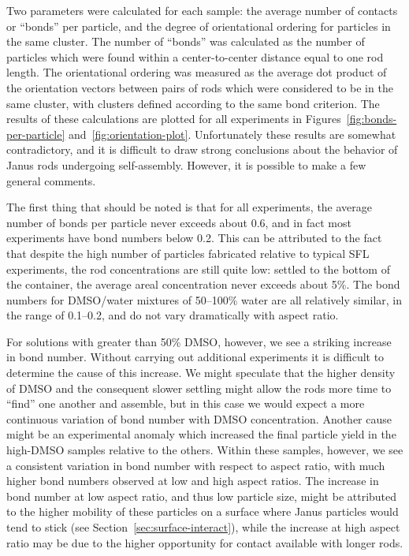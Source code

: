 Two parameters were calculated for each sample: the average number of contacts or ``bonds''
per particle, and the degree of orientational ordering for particles in the same cluster.
The number of ``bonds'' was calculated as the number of particles which were found within a 
center-to-center distance equal to one rod length.  The orientational ordering was measured
as the average dot product of the orientation vectors between pairs of rods which were 
considered to be in the same cluster, with clusters defined according to the same bond criterion.
The results of these calculations are plotted for all experiments in Figures~\ref{fig:bonds-per-particle}
and~\ref{fig:orientation-plot}.  Unfortunately these results are somewhat contradictory, and it 
is difficult to draw strong conclusions about the behavior of Janus rods undergoing self-assembly.
However, it is possible to make a few general comments.

The first thing that should be noted is that for all experiments, the average number of bonds per
particle never exceeds about 0.6, and in fact most experiments have bond numbers below 0.2.  This
can be attributed to the fact that despite the high number of particles fabricated relative to
typical SFL experiments, the rod concentrations are still quite low: settled to the bottom of the
container, the average areal concentration never exceeds about 5\%.  The bond numbers for 
DMSO/water mixtures of 50--100\% water are all relatively similar, in the range of 0.1--0.2, and do
not vary dramatically with aspect ratio.  

For solutions with greater than 
50\% DMSO, however, we see a striking increase in bond number.  Without carrying out additional experiments it 
is difficult to determine the cause of this increase. We might speculate that the higher density of DMSO
and the consequent slower settling might allow the rods more time to ``find'' one another and assemble, but in
this case we would expect a more continuous variation of bond number with DMSO concentration. Another cause might
be an experimental anomaly which increased the final particle yield in the high-DMSO samples relative to the others.
Within these samples, however, we see a consistent variation in bond number with respect to aspect ratio, with
much higher bond numbers observed at low and high aspect ratios.  The increase in bond number at low aspect ratio, 
and thus low particle size, might be attributed to the higher mobility of these particles on a surface where
Janus particles would tend to stick (see Section~\ref{sec:surface-interact}), while the increase at high aspect
ratio may be due to the higher opportunity for contact available with longer rods.

